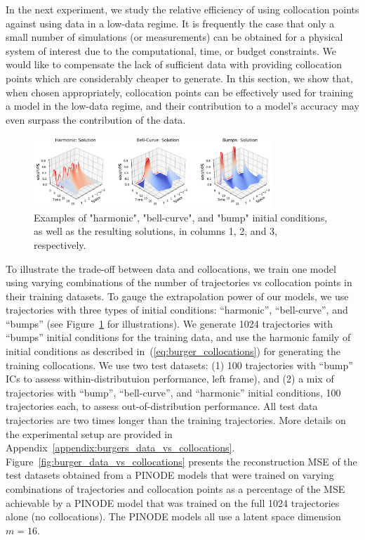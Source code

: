 In the next experiment, we study the relative efficiency of using collocation points against using data in a low-data regime. It is frequently the case that only a small number of simulations (or measurements) can be obtained for a physical system of interest due to the computational, time, or budget constraints. We would like to compensate the lack of sufficient data with providing collocation points which are considerably cheaper to generate. In this section, we show that, when chosen appropriately, collocation points can be effectively used for training a model in the low-data regime, and their contribution to a model's accuracy may even surpass the contribution of the data. 
\begin{figure}[t]
    \centering
    \includegraphics[width=0.8\textwidth]{figures/burgers_examples_of_ics.pdf}
    \caption{Examples of "harmonic", "bell-curve", and "bump" initial conditions, as well as the resulting solutions, in columns 1, 2, and 3, respectively.}
    \label{fig:burgers_examples_of_ics}
\end{figure}

To illustrate the trade-off between data and collocations, we train one model using varying combinations of the number of trajectories vs collocation points in their training datasets. To gauge the extrapolation power of our models, we use trajectories with three types of initial conditions: ``harmonic'', ``bell-curve'', and ``bumps'' (see Figure~\ref{fig:burgers_examples_of_ics} for illustrations). We generate 1024 trajectories with ``bumps'' initial conditions for the training data, and use the harmonic family of initial conditions as described in~(\ref{eq:burger_collocations}) for generating the training collocations. We use two test datasets: (1) 100 trajectories with ``bump'' ICs to assess within-distributuion performance, left frame), and (2) a mix of trajectories with ``bump'', ``bell-curve'', and ``harmonic'' initial conditions, 100 trajectories each, to assess out-of-distribution performance. All test data trajectories are two times longer than the training trajectories. More details on the experimental setup are provided in Appendix~\ref{appendix:burgers_data_vs_collocations}. Figure~\ref{fig:burger_data_vs_collocations} presents the reconstruction MSE of the test datasets obtained from a PINODE models that were trained on varying combinations of trajectories and collocation points as a percentage of the MSE achievable by a PINODE model that was trained on the full 1024 trajectories alone (no collocations). The PINODE models all use a latent space dimension $m=16$. 

